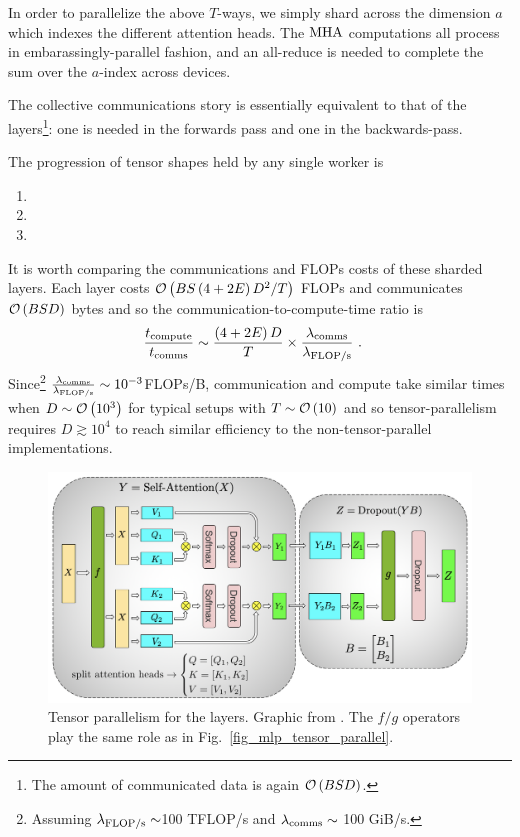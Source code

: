 \documentclass[11pt]{article}
\begin{document}
In order to parallelize the above $ T $-ways, we simply shard across the dimension $ a $  which
indexes the different attention heads.  The $ {\rm MHA} $ computations all process in
embarassingly-parallel fashion, and an all-reduce is needed to complete the sum over the $ a $-index
across devices.

The collective communications story is essentially
equivalent to that of the  layers\footnote{The amount of communicated data is again $ \mathcal{O} \left( BSD
\right)$. }: one  is needed in the forwards pass
and one  in the backwards-pass.

The progression of tensor shapes held by any single worker is
\begin{enumerate}
    \item {}
    \item {}
    \item {}
\end{enumerate}


It is worth comparing the communications and FLOPs costs of these sharded layers. Each layer costs
$ \mathcal{O} \left(    BS \left ( 4+2E \right )  D ^{ 2 }/T \right)$ FLOPs and communicates
$ \mathcal{O} \left( BSD \right)  $ bytes and so the communication-to-compute-time ratio is
\begin{align}
  \frac{ t _{ {\rm  compute} } }{ t _{ {\rm  comms} } } & \sim  \frac{ \left ( 4+2E \right) D }{ T }\times \frac{ \lambda _{ {\rm comms} }  }{ \lambda _{ {\rm FLOP/s} }} \ .
\end{align}
Since\footnote{Assuming $ \lambda _{\rm  FLOP/s }\sim  $100 TFLOP/s and $ \lambda _{ {\rm comms} }
\sim $ 100 GiB/s.} $ \frac{ \lambda _{ {\rm comms} }  }{ \lambda _{ {\rm FLOP/s} }} \sim 10 ^{ -3 }
$FLOPs/B, communication and compute take similar times when  $ D \sim \mathcal{O} \left( 10 ^{ 3 } \right)
$ for typical setups with $ T \sim \mathcal{O} \left( 10 \right)  $ and so tensor-parallelism requires
$ D \gtrsim 10 ^{ 4 } $ to reach similar efficiency to the non-tensor-parallel implementations.


\begin{figure}[ht]
	\centering
	\includegraphics[scale=.45]{figures/attention_mp_2.png}
	\caption{Tensor parallelism for the  layers. Graphic from
		\cite{shoeybi2020megatronlm}. The $ f/g $ operators play the same role as in
		Fig.~\ref{fig_mlp_tensor_parallel}.}
	\label{fig_attn_tensor_parallel}
\end{figure}
\end{document}
